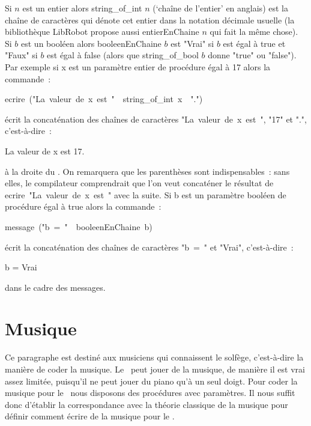 Si $n$ est un entier alors {\idt string\_of\_int $n$} (`chaîne de l'entier' en anglais) est la chaîne de
caractères qui dénote cet entier dans la notation
décimale usuelle (la bibliothèque {\idt LibRobot} propose aussi {\idt entierEnChaine $n$}
qui fait la même chose). Si $b$ est un booléen alors  {\idt booleenEnChaine $b$} est
{\cha "Vrai"}
si $b$ est égal à {\idt true} et
{\cha "Faux"}
si $b$ est égal à {\idt false} (alors que {\idt string\_of\_bool $b$} donne {\cha "true"} ou
{\cha "false"}).
Par exemple si {\idt x} est un paramètre entier de procédure égal à 17 alors la
commande~:
\begin{center}
{\idt  ecrire\ (}{\cha "La\ valeur\ de\ x\ est\ "}\ {\idt {}\ string\_of\_int\ x\ }\ {\cha "."}{\idt )}
\end{center}
\' ecrit la concaténation des chaînes  de caractères
{\cha "La\ valeur\ de\ x\ est\ "},
{\cha "17"}
et {\cha "."}, c'est-à-dire~:
\begin{center}
{\idt La valeur de x est 17.}
\end{center}
à la droite du \robot. On remarquera que les parenthèses sont indispensables~: sans elles,
le compilateur comprendrait que l'on veut concaténer le résultat de
{\idt ecrire}\ {\cha "La\ valeur\ de\ x\ est\ "} avec la suite.
Si {\idt b} est un paramètre booléen de procédure égal à {\idt true} alors la
commande~:
\begin{center}
{\idt  message\ (}{\cha "b\ =\ "}\ {\idt {}\ booleenEnChaine\ b)}
\end{center}
écrit la concaténation des chaînes  de caractères
{\cha "b\ =\ "}
et {\cha "Vrai"}, c'est-à-dire~:
\begin{center}
{\idt b = Vrai}
\end{center}
dans le cadre des messages.


\section{Musique}

Ce paragraphe est destiné aux musiciens qui connaissent le solfège, c'est-à-dire la manière
de coder la musique.  Le \robot\ peut jouer de la musique, de
manière il est vrai assez limitée, puisqu'il ne peut jouer du piano qu'à un seul doigt. Pour
coder la musique pour le \robot\ nous disposons des procédures avec paramètres. Il
nous suffit donc d'établir la correspondance avec la théorie classique de la musique
\cite{solfege} pour définir comment écrire de la musique pour le \robot.


